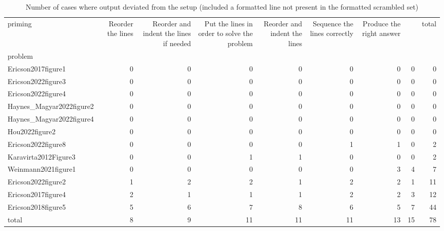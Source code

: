 \begin{table}
\caption{Number of cases where output deviated from the setup (included a formatted line not present in the formatted scrambled set)}
\label{tab:pep8-deviation}
\begin{tabular}{lrrrrrrrr}
\toprule
priming & Reorder the lines & Reorder and indent the lines if needed & Put the lines in order to solve the problem & Reorder and indent the lines & Sequence the lines correctly & Produce the right answer &  & total \\
problem &  &  &  &  &  &  &  &  \\
\midrule
Ericson2017figure1 & 0 & 0 & 0 & 0 & 0 & 0 & 0 & 0 \\
Ericson2022figure3 & 0 & 0 & 0 & 0 & 0 & 0 & 0 & 0 \\
Ericson2022figure4 & 0 & 0 & 0 & 0 & 0 & 0 & 0 & 0 \\
Haynes_Magyar2022figure2 & 0 & 0 & 0 & 0 & 0 & 0 & 0 & 0 \\
Haynes_Magyar2022figure4 & 0 & 0 & 0 & 0 & 0 & 0 & 0 & 0 \\
Hou2022figure2 & 0 & 0 & 0 & 0 & 0 & 0 & 0 & 0 \\
Ericson2022figure8 & 0 & 0 & 0 & 0 & 1 & 1 & 0 & 2 \\
Karavirta2012Figure3 & 0 & 0 & 1 & 1 & 0 & 0 & 0 & 2 \\
Weinmann2021figure1 & 0 & 0 & 0 & 0 & 0 & 3 & 4 & 7 \\
Ericson2022figure2 & 1 & 2 & 2 & 1 & 2 & 2 & 1 & 11 \\
Ericson2017figure4 & 2 & 1 & 1 & 1 & 2 & 2 & 3 & 12 \\
Ericson2018figure5 & 5 & 6 & 7 & 8 & 6 & 5 & 7 & 44 \\
total & 8 & 9 & 11 & 11 & 11 & 13 & 15 & 78 \\
\bottomrule
\end{tabular}
\end{table}

